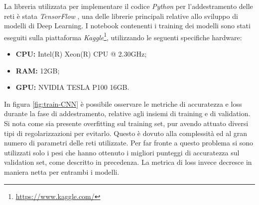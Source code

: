 \documentclass[11pt]{report}
\begin{document}
La libreria utilizzata per implementare il codice \textit{Python} per l'addestramento delle reti è stata \textit{TensorFlow} \cite{tensorflow}, una delle librerie principali relative allo sviluppo di modelli di Deep Learning. I notebook contenenti i training dei modelli sono stati eseguiti sulla piattaforma \textit{Kaggle}\footnote{\url{https://www.kaggle.com/}}, utilizzando le seguenti specifiche hardware:
\begin{itemize}
    \item \textbf{CPU:} Intel(R) Xeon(R) CPU @ 2.30GHz;
    \item \textbf{RAM:} 12GB;
    \item \textbf{GPU:} NVIDIA TESLA P100 16GB.
\end{itemize}



In figura \ref{fig:train-CNN} è possibile osservare le metriche di accuratezza e loss durante la fase di addestramento, relative agli insiemi di training e di validation. Si nota come sia presente overfitting sul training set, pur avendo attuato diversi tipi di regolarizzazioni per evitarlo. Questo è dovuto alla complessità ed al gran numero di parametri delle reti utilizzate. Per far fronte a questo problema si sono utilizzati solo i pesi che hanno ottenuto i migliori punteggi di accuratezza sul validation set, come descritto in precedenza. La metrica di loss invece decresce in maniera netta per entrambi i modelli.
\end{document}
